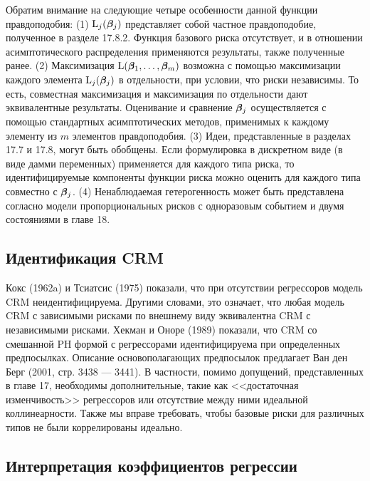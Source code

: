 Обратим внимание на следующие четыре особенности данной функции правдоподобия:
(1) $\mathrm{L}_j(\bm{\beta}_j)$ представляет собой частное правдоподобие, полученное в разделе 17.8.2. %
Функция базового риска отсутствует, и в отношении асимптотического распределения применяются результаты, также полученные ранее.
(2) Максимизация $\mathrm{L}(\bm{\beta}_1, \ldots , \bm{\beta}_m)$ возможна с помощью максимизации каждого элемента $\mathrm{L}_j(\bm{\beta}_j)$ в отдельности, при условии, что риски независимы. То есть, совместная максимизация и максимизация по отдельности дают эквивалентные результаты.
Оценивание и сравнение $\bm{\beta}_j$ осуществляется с помощью стандартных асимптотических методов, применимых к каждому элементу из $m$ элементов правдоподобия.
(3) Идеи, представленные в разделах
17.7 %
и 17.8, %
могут быть обобщены. Если формулировка в дискретном виде (в виде дамми переменных) применяется для каждого типа риска, то идентифицируемые компоненты функции риска можно оценить для каждого типа совместно с $\bm{\beta}_j$.
(4) Ненаблюдаемая гетерогенность может быть представлена согласно модели пропорциональных рисков с одноразовым событием и двумя состояниями в главе 18. %

\subsection{Идентификация CRM}\label{sec:19.2.3}

\noindent
Кокс (1962a) и Тсиатсис (1975) показали, что при отсутствии регрессоров модель CRM неидентифицируема. Другими словами, это означает, что любая модель CRM с зависимыми рисками по внешнему виду %
эквивалентна CRM с независимыми рисками. Хекман и Оноре (1989) показали, что CRM со смешанной PH формой с регрессорами идентифицируема  при определенных предпосылках. Описание основополагающих предпосылок предлагает Ван ден Берг (2001, стр. 3438 --- 3441). В частности, помимо допущений, представленных в главе 17, %
необходимы дополнительные, такие как <<достаточная изменчивость>> регрессоров или отсутствие между ними идеальной коллинеарности. Также мы вправе требовать, чтобы базовые риски для различных типов не были коррелированы идеально.


\subsection{Интерпретация коэффициентов регрессии}\label{sec:19.2.4}

